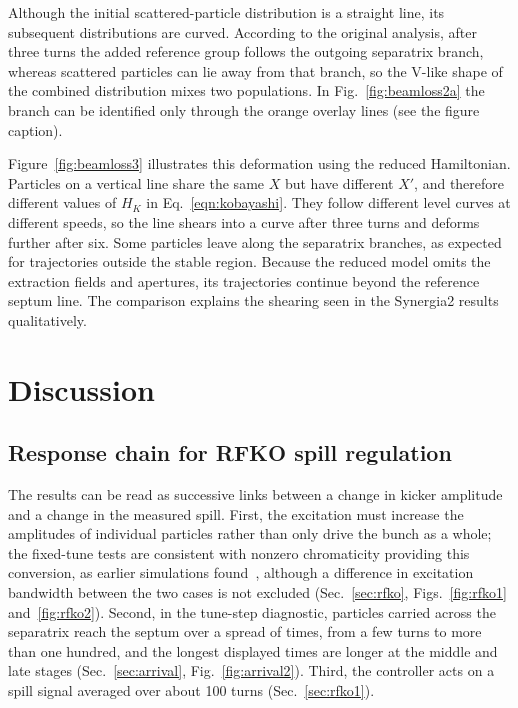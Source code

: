 \documentclass[a4paper,fleqn]{cas-sc}
\begin{document}
Although the initial scattered-particle distribution is a straight line, its subsequent distributions are curved. According to the original analysis, after three turns the added reference group follows the outgoing separatrix branch, whereas scattered particles can lie away from that branch, so the V-like shape of the combined distribution mixes two populations. In Fig.~\ref{fig:beamloss2a} the branch can be identified only through the orange overlay lines (see the figure caption).

Figure~\ref{fig:beamloss3} illustrates this deformation using the reduced Hamiltonian. Particles on a vertical line share the same $X$ but have different $X'$, and therefore different values of $H_K$ in Eq.~\eqref{eqn:kobayashi}. They follow different level curves at different speeds, so the line shears into a curve after three turns and deforms further after six. Some particles leave along the separatrix branches, as expected for trajectories outside the stable region. Because the reduced model omits the extraction fields and apertures, its trajectories continue beyond the reference septum line. The comparison explains the shearing seen in the Synergia2 results qualitatively.

\section{\label{sec:discussion}Discussion}

\subsection{\label{sec:chain}Response chain for RFKO spill regulation}

The results can be read as successive links between a change in kicker amplitude and a change in the measured spill. First, the excitation must increase the amplitudes of individual particles rather than only drive the bunch as a whole; the fixed-tune tests are consistent with nonzero chromaticity providing this conversion, as earlier simulations found~\cite{ipac11}, although a difference in excitation bandwidth between the two cases is not excluded (Sec.~\ref{sec:rfko}, Figs.~\ref{fig:rfko1} and~\ref{fig:rfko2}). Second, in the tune-step diagnostic, particles carried across the separatrix reach the septum over a spread of times, from a few turns to more than one hundred, and the longest displayed times are longer at the middle and late stages (Sec.~\ref{sec:arrival}, Fig.~\ref{fig:arrival2}). Third, the controller acts on a spill signal averaged over about 100 turns (Sec.~\ref{sec:rfko1}).
\end{document}
